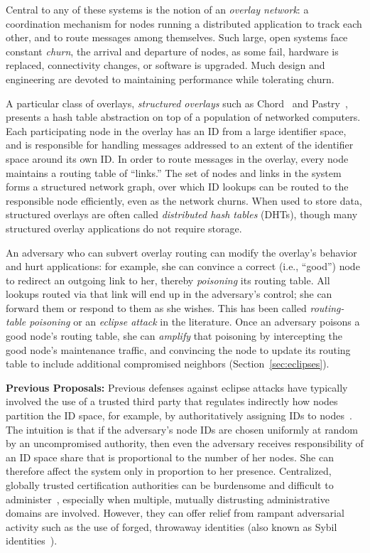 \documentclass[10pt,twocolumn]{article}
\renewcommand{\paragraph}[1]{\textbf{#1:}}
\begin{document}
Central to any of these systems is the notion of an {\em overlay
network}: a coordination mechanism for nodes running 
a distributed application to track each other, and to route messages
among themselves.  
Such large, open systems face constant \emph{churn},
the arrival and departure of nodes, as some fail,
hardware is replaced, connectivity changes, or software is upgraded.  
Much design and engineering are devoted to maintaining performance while
tolerating churn.

A particular class of overlays, \emph{structured overlays}
such as Chord~\cite{Stoica2003} and Pastry~\cite{Rowstron2001},
presents a hash table abstraction on top of a population of networked
computers.  Each participating node in the overlay has an ID from
a large identifier space, and is responsible for handling
messages addressed to an extent of the identifier space around its own
ID.  In order
to route messages in the overlay,
every node maintains a
routing table of ``links.''  The set of nodes and links in the system 
forms a structured network graph, over which
ID lookups can be routed to the responsible node efficiently,
even as the network churns.  When used to store data, structured
overlays are often called \emph{distributed hash tables} (DHTs), though many
structured overlay applications do not require storage.

An adversary who can subvert overlay routing can 
modify the overlay's behavior and hurt applications:
for example, she can convince a
correct (i.e., ``good'') node to redirect an outgoing link to
her, thereby \emph{poisoning} its routing table.  
All lookups routed via that link will end up in the adversary's
control; she can forward them or respond to them as she wishes.  This
has been called \emph{routing-table poisoning} or
an \emph{eclipse attack} in the literature.  
Once an adversary poisons a good node's routing table, she can {\em amplify}
that poisoning by intercepting the good node's maintenance
traffic, and convincing the node to update its routing table to
include additional compromised neighbors (Section~\ref{sec:eclipses}).

\paragraph{Previous Proposals}
Previous defenses against eclipse attacks have typically involved the
use of a trusted third party that regulates indirectly how nodes
partition the ID space, for example, by authoritatively assigning
IDs to nodes~\cite{Castro2002}.  The intuition is that if the
adversary's node IDs are chosen uniformly at random by an uncompromised
authority, then even the adversary receives
responsibility of an ID space share that is proportional to the number
of her nodes. She can therefore affect the system only in proportion to
her presence.
Centralized, globally
trusted certification authorities can be burdensome and difficult to
administer~\cite{Davis1996}, especially when multiple, mutually
distrusting administrative domains are involved.  However, they can offer
relief from rampant adversarial activity such as the use of forged,
throwaway identities (also known as Sybil
identities~\cite{Douceur2002}).
\end{document}

